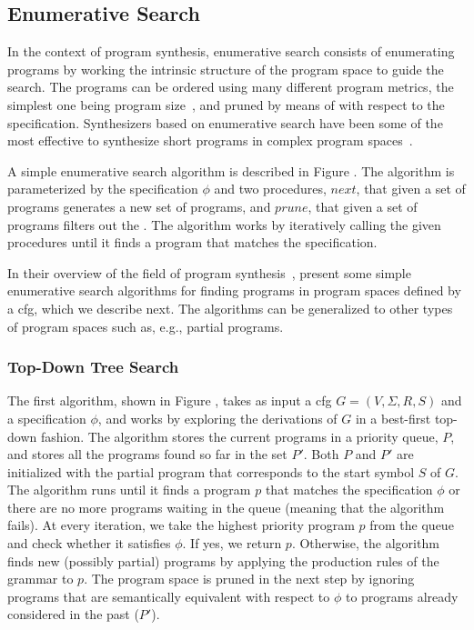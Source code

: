 \subsection{Enumerative Search}
\label{sec:enumerative-search}

In the context of program synthesis, enumerative search consists of
enumerating programs by working the intrinsic structure of the program space to
guide the search. The programs can be ordered using many different program
metrics, the simplest one being program size~\cite{Alur:sygus:2013}, and pruned
by means of  with respect to the specification.
Synthesizers based on enumerative search have been some of the most effective
to synthesize short programs in complex program spaces~\cite{Gulwani2017}.

A simple enumerative search algorithm is described in Figure . The algorithm is parameterized by the
specification $\phi{}$ and two procedures, $next$, that given a set of programs
generates a new set of programs, and $prune$, that given a set of programs
filters out the . The algorithm works by iteratively calling the given procedures until
it finds a program that matches the specification.

In their overview of the field of program synthesis~\cite{Gulwani2017},
\citeauthor{Gulwani2017} present some simple enumerative search algorithms for
finding programs in program spaces defined by a \gls{cfg}, which we describe
next. The algorithms can be generalized to other types of program spaces such
as, e.g., partial programs.

\subsubsection{Top-Down Tree Search}
\label{sec:top-down-tree-search}

The first algorithm, shown in Figure , takes as input a \gls{cfg} $G = (V, \Sigma{}, R, S)$ and a
specification $\phi{}$, and works by exploring the derivations of $G$ in a
best-first top-down fashion. The algorithm stores the current programs in a
priority queue, $P$, and stores all the programs found so far in the set $P'$.
Both $P$ and $P'$ are initialized with the partial program that corresponds to
the start symbol $S$ of $G$. The algorithm runs until it finds a program $p$
that matches the specification $\phi{}$ or there are no more programs waiting in
the queue (meaning that the algorithm fails). At every iteration, we take the
highest priority program $p$ from the queue and check whether it satisfies
$\phi{}$. If yes, we return $p$. Otherwise, the algorithm finds new (possibly
partial) programs by applying the production rules of the grammar to $p$. The
program space is pruned in the next step by ignoring programs that are
semantically equivalent with respect to $\phi{}$ to programs already considered
in the past ($P'$).

